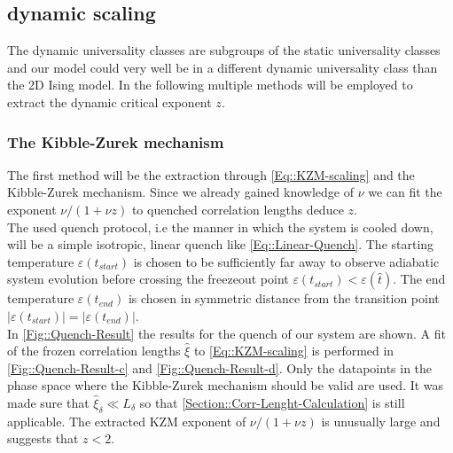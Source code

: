 		\subsection{dynamic scaling}
		The dynamic universality classes are subgroups of the static universality classes and our model could very well be in a different dynamic universality class than the 2D Ising model. In the following multiple methods will be employed to extract the dynamic critical exponent $z$. 
		
		\subsubsection{The Kibble-Zurek mechanism}
		The first method will be the extraction through \autoref{Eq::KZM-scaling} and the Kibble-Zurek mechanism. Since we already gained knowledge of $\nu$ we can fit the exponent $\nu /	(1 + \nu z)$ to quenched correlation lengths deduce $z$. \\
		
		The used quench protocol, i.e the manner in which the system is cooled down, will be a simple isotropic, linear quench like \autoref{Eq::Linear-Quench}. The starting temperature $\varepsilon(t_{start})$ is chosen to be sufficiently far away to observe adiabatic system evolution before crossing the freezeout point $\varepsilon(t_{start}) < \varepsilon(\hat{t})$. The end temperature $\varepsilon(t_{end})$ is chosen in symmetric distance from the transition point $|\varepsilon(t_{start})|=|\varepsilon(t_{end})|$. \\
		
		In \autoref{Fig::Quench-Result} the results for the quench of our system are shown. A fit of the frozen correlation lengths $\hat{\xi}$ to \autoref{Eq::KZM-scaling} is performed in \autoref{Fig::Quench-Result-c} and \autoref{Fig::Quench-Result-d}. Only the datapoints in the phase space where the Kibble-Zurek mechanism should be valid are used. It was made sure that $\hat{\xi}_\delta \ll L_\delta$ so that \autoref{Section::Corr-Lenght-Calculation} is still applicable. The extracted KZM exponent of $\nu /( 1 + \nu z)$ is unusually large and suggests that $z < 2$. \\
		
